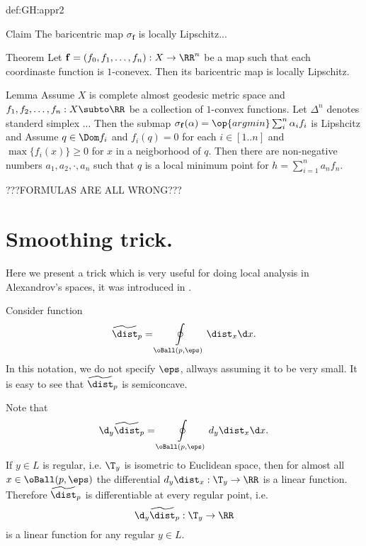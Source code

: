 {\begin{subthm}{def:GH:appr2}
\begin{thm}{Claim}
The baricentric map $\sigma_{\mathbf{f}}$ is locally Lipschitz...
\end{thm}


\begin{thm}{Theorem}
Let $\mathbf{f}=(f_0,f_1,\dots,f_n):X\to\RR^n$ be a map such that each coordinaste function is $1$-conevex.
Then its baricentric map is locally Lipschitz.
\end{thm}



\begin{thm}{Lemma}\label{lem:conv-map}
Assume $X$ is complete almost geodesic metric space and $f_1,f_2,\dots,f_n:X\subto\RR$ be a collection of $1$-convex functions.
Let $\Delta^n$ denotes standerd simplex ...
Then the submap $\sigma_{\mathbf{f}}(\mathbf{\alpha})=\op{argmin}\sum_i^n\alpha_if_i$ 
is Lipshcitz and 
Assume $q\in \Dom f_i$ and $f_i(q)=0$ for each $i\in[1..n]$ and $\max\{f_i(x)\}\ge 0$ for $x$ in a neigborhood of $q$.
Then there are non-negative numbers $a_1,a_2,\cdot,a_n$ such that $q$ is a local minimum point for
$h=\sum_{i=1}^n a_nf_n$.
\end{thm}

???FORMULAS ARE ALL WRONG???















\section{Smoothing trick.}\label{smooth}
Here we present a trick which is very useful for doing local analysis in
Alexandrov's spaces, it was introduced in \cite[section 5]{otsu-shioya}.

Consider function
$$\widetilde\dist_p=\oint\limits_{\oBall(p,\eps)}\dist_x\d x.$$
In this notation, we do not specify $\eps$, 
allways assuming it to be very small.
It is easy to see that $\widetilde\dist_p$ is semiconcave.

Note that 
$$\d_y\widetilde\dist_p=\oint\limits_{\oBall(p,\eps)}d_y\dist_x\d x.$$
If $y\in L$ is regular, i.e. $\T_y$ is isometric to
Euclidean space, then for almost all $x\in \oBall(p,\eps)$ the differential $d_y\dist_x:\T_y\to\RR$ is
a linear function.
Therefore $\widetilde\dist_p$ is differentiable at every regular point, i.e.
$$\d_y\widetilde\dist_p:\T_y\to\RR$$
is a linear function for any regular $y\in L$.


\end{subthm}}

